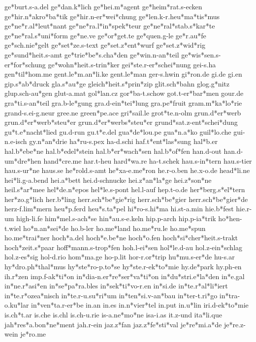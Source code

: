ge*burt.s-a.del
ge*dan.k*lich
ge*hei.m*agent
ge*heim*rat.s-ecken
ge*hir.n*akro*ba*tik
ge*hir.n-er*wei*chung
ge*len.k-r.heu*ma*tis*mus
ge*ne*r.al*leut*nant
ge*ne*ra.l*in*spek*teur
ge*ne*ral*stab.s*kar*te
ge*ne*ral.s*uni*form
ge*ne.ve
ge*or*get.te
ge*quen.g-le
ge*r.au*fe
ge*sch.nie*gelt
ge*set*ze.s-text
ge*set.z*ent*wurf
ge*set.z*wid*rig
ge*sund*heit.s-amt
ge*trie*be*s.cha*den
ge*win.n-an*teil
ge*wis*sen.s-er*for*schung
ge*wohn*heit.s-trin*ker
gei*ste.r-er*schei*nung
gei-s.ha
gen*til*hom.me
gent.le*m.an*li.ke
gent.le*man
ger-s.hwin
gi*ron.de
gi.de
gi.en
gip.s*ab*druck
gla.s*au*ge
gleich*heit.s*prin*zip
glit.sch*bahn
glog.g*nitz
glup.sch-au*gen
glut-a.mat
gol*lan.cz
gor*ba-t.schow
got.t-er*bar*men
gour.de
gra*ti.s-an*teil
gra.b-le*gung
gra.d-ein*tei*lung
gra.pe*fruit
gram.m*ka*lo*rie
grand-s.ei-g.neur
gree.ne
green*pe.ace
gri*sail.le
grot*te.n-olm
grun.d*er*werb
grun.d*er*werb*steu*er
grun.d*er*werbs*steu*er
grund*sat.z-ent*schei*dung
gu*t.e*nacht*lied
gu.d-run
gu.t*e.del
gua*de*lou.pe
gua*n.a*ko
guil*lo.che
gui-n.e-isch
gy.n*an*drie
ha*ru-s.pex
ha-d.schi
haf.t*ent*las*sung
hal*b.er
hal.b*ebe*ne
hal.b*edel*stein
hal.b*er*wach*sen
hal.b*of*fen
han.d-out
han.d-um*dre*hen
hand*cre.me
har.t-heu
hard*wa.re
ha-t.schek
hau.s-in*tern
hau.s-tier
hau.s-ur*ne
haus.se
he*rold.s-amt
he*xa-e.me*ron
he.r-o.ben
he.x-o.de
head*li.ne
hei*li.g-a.bend
hei.a*bett
hei.d-schnucke
hei.z*an*la*ge
hei.z*son*ne
heil.s*ar*mee
hel*de.n*epos
hel*le.s-pont
hel.l-auf
hep.t-o.de
her*berg.s*el*tern
her*zo.g*lich
her.b*ling
herr.sch*be*gie*rig
herr.sch*be*gier
herr.sch*be*gier*de
herz-f.lim*mern
heu*p.ferd
heu*s.ta*pel
hi*ro-s.hi*ma
hi.st-a.min
hie.b*fest
hie.r-um
high-li.fe
him*mel.s-ach*se
hin*au.s-e.keln
hip.p-arch
hip.p-ia*trik
ho*hen-t.wiel
ho*n.an*sei*de
ho.b-ler
ho.me*land
ho.me*ru.le
ho.me*spun
ho.me*trai*ner
hoch*a.del
hoch*e.be*ne
hoch*o.fen
hoch*si*cher*heit.s-trakt
hoch*zeit.s*paar
hoff*mann.s-trop*fen
hoh.l-ei*sen
hol*le.d-au
hol.z-ein*schlag
hol.z-es*sig
hol-d.rio
hom*ma.ge
ho-p.lit
hor-r.or*trip
hu*mu.s-er*de
hu-s.ar
hy*dro.ph*thal*mus
hy*ste*ro-p.to*se
hy*ste.r-ek*to*mie
hy.de*park
hy.ph-en
ih.r*zen
imp.f-ak*ti*on
in*dia-n.er*re*ser*va*ti*on
in*du*stri.e*la*den
in*e.gal
in*ne.r*asi*en
in*se*pa*ra.bles
in*sek*ti*vo-r.en
in*si.de
in*te.r*al*li*iert
in*te.r*ozea*nisch
in*te.r-u.su*ri*um
in*ten*si.v-an*bau
in*ter-t.ri*go
in*tra-o.ku*lar
in*ven*ta.r-er*be
in.an
in.es
in.n*vier*tel
in.put
in.u*lin
iri.d-ek*to*mie
is.ch*t.ar
is.che
is.chl
is.ch-u.rie
is-a.ne*mo*ne
isa-i.as
it.z-und
ita*li.que
jah*res*a.bon*ne*ment
jah.r-ein
jaz.z*fan
jaz.z*fe*sti*val
je*re*mi.a*de
je*re.z-wein
je*ro.me
